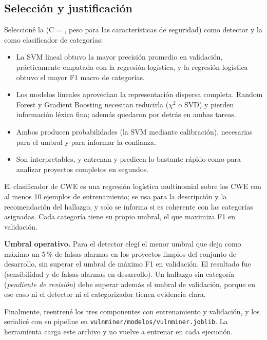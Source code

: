 \documentclass[12pt,a4paper]{article}
\newcommand{\ruta}[1]{\nolinkurl{#1}}
\begin{document}
\subsection{Selección y justificación}
Seleccioné la \textbf{\detAlgoritmo} (C = \detC, peso \pesoSeguridad{} para las características de seguridad) como detector y la \textbf{\catAlgoritmo} como clasificador de categorías:
\begin{itemize}
  \item La SVM lineal obtuvo la mayor precisión promedio en validación, prácticamente empatada con la regresión logística, y la regresión logística obtuvo el mayor F1 macro de categorías.
  \item Los modelos lineales aprovechan la representación dispersa completa. Random Forest y Gradient Boosting necesitan reducirla (\(\chi^2\) o SVD) y pierden información léxica fina; además quedaron por detrás en ambas tareas.
  \item Ambos producen probabilidades (la SVM mediante calibración), necesarias para el umbral y para informar la confianza.
  \item Son interpretables, y entrenan y predicen lo bastante rápido como para analizar proyectos completos en segundos.
\end{itemize}

El clasificador de CWE es una regresión logística multinomial sobre los \nClasesCWE{} CWE con al menos 10 ejemplos de entrenamiento; se usa para la descripción y la recomendación del hallazgo, y solo se informa si es coherente con las categorías asignadas. Cada categoría tiene su propio umbral, el que maximiza F1 en validación.

\textbf{Umbral operativo.} Para el detector elegí el menor umbral que deja como máximo un 5\,\% de falsas alarmas en los proyectos limpios del conjunto de desarrollo, sin superar el umbral de máximo F1 en validación. El resultado fue \umbral{} (sensibilidad \devSensibilidad{} y \devFA{} de falsas alarmas en desarrollo). Un hallazgo sin categoría (\emph{pendiente de revisión}) debe superar además el umbral de validación, porque en ese caso ni el detector ni el categorizador tienen evidencia clara.

Finalmente, reentrené los tres componentes con entrenamiento y validación, y los serialicé con su pipeline en \ruta{vulnminer/modelos/vulnminer.joblib}. La herramienta carga este archivo y no vuelve a entrenar en cada ejecución.

\end{document}
